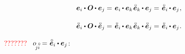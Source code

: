 \nopagebreak\vspace{-0.2em}\begin{equation}\label{componentsofrotationtensor}
\begin{array}{c}
\bm{e}_{i} \dotp \rotationtensor \hspace{-0.1ex} \dotp \bm{e}_{j} =
\hspace{.2ex} \tikzmark{beginEqualsKroneckerDeltaPresent} \bm{e}_{i} \hspace{-0.1ex} \dotp \bm{e}_{k} \tikzmark{endEqualsKroneckerDeltaPresent} \hspace{.2ex} \mathcircabove{\bm{e}}_{k} \hspace{-0.1ex} \dotp \bm{e}_{j} =
\hspace{.2ex} \mathcircabove{\bm{e}}_{i} \hspace{-0.1ex} \dotp \bm{e}_{j}
\hspace{.1ex} ,
\\[1.4em]
%
\mathcircabove{\bm{e}}_{i} \dotp \rotationtensor \hspace{-0.1ex} \dotp \mathcircabove{\bm{e}}_{j} =
\hspace{.2ex} \mathcircabove{\bm{e}}_{i} \hspace{-0.1ex} \dotp \bm{e}_{k} \hspace{.2ex} \tikzmark{beginEqualsKroneckerDeltaPast} \mathcircabove{\bm{e}}_{k} \hspace{-0.1ex} \dotp \mathcircabove{\bm{e}}_{j} \tikzmark{endEqualsKroneckerDeltaPast} =
\hspace{.2ex} \mathcircabove{\bm{e}}_{i} \hspace{-0.1ex} \dotp \bm{e}_{j}
\hspace{.1ex} .
\end{array}
\end{equation}

\vspace{-0.1em}\noindent
{}\en{,}
  \textcolor{red}{???????} ~${\cosinematrix{\!j\mathcircabove{i}} = \hspace{.1ex} \mathcircabove{\bm{e}}_i \dotp \bm{e}_j}$\hspace{.1ex}:

